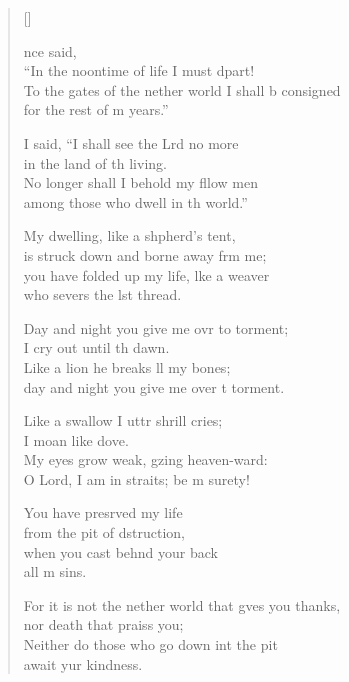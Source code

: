 \settowidth{\versewidth}{To the gates of the nether world I shall be consigned *}
\begin{verse}[\versewidth]
  \begin{patverse}
    nce  said,\Med\\
“In the noontime of life I must dpart!\\
To the gates of the nether world I shall b consigned\Med\\
for the rest of m years.”

I said, “I shall see the Lrd no more\Med\\
in the land of th living.\\
No longer shall I behold my fllow men\Med\\
among those who dwell in th world.”

My dwelling, like a shpherd’s tent,\Med\\
is struck down and borne away frm me;\\
you have folded up my life, l\pointup{\i}ke a weaver\Med\\
who severs the lst thread.

Day and night you give me ovr to torment;\Med\\
I cry out until th dawn.\\
Like a lion he breaks ll my bones;\Med\\
day and night you give me over t torment.

Like a swallow I uttr shrill cries;\Med\\
I moan like  dove.\\
My eyes grow weak, gzing heaven-ward:\Med\\
O Lord, I am in straits; be m surety!

You have presrved my life\Med\\
from the pit of dstruction,\\
when you cast beh\pointup{\i}nd your back\Med\\
all m sins.

For it is not the nether world that g\pointup{\i}ves you thanks,\Med\\
nor death that praiss you;\\
Neither do those who go down int the pit\Med\\
await yur kindness.


\end{patverse}
\end{verse}
